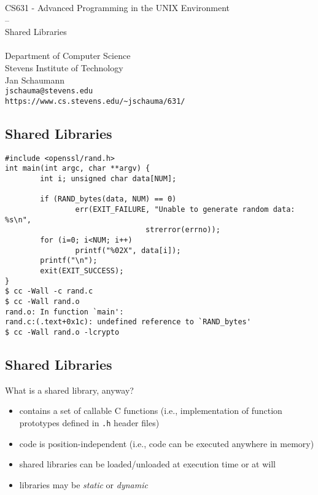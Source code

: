 \documentclass[xga]{xdvislides}
\begin{document}
\setfontphv

\lhead{\slidetitle}
\cfoot{\relax}
\rfoot{\Gray{\today}}

\newcommand{\smallish}{\fontsize{15}{20}\selectfont}

\vspace*{\fill}
\begin{center}
	\Hugesize
		CS631 - Advanced Programming in the UNIX Environment\\
		-- \\
		Shared Libraries\\
	\hspace*{5mm}\blueline\\ [1em]
	\Normalsize
		Department of Computer Science\\
		Stevens Institute of Technology\\
		Jan Schaumann\\
		\verb+jschauma@stevens.edu+\\
		\verb+https://www.cs.stevens.edu/~jschauma/631/+
\end{center}
\vspace*{\fill}

\subsection{Shared Libraries}
\begin{verbatim}
#include <openssl/rand.h>
int main(int argc, char **argv) {
        int i; unsigned char data[NUM];

        if (RAND_bytes(data, NUM) == 0)
                err(EXIT_FAILURE, "Unable to generate random data: %s\n",
                                strerror(errno));
        for (i=0; i<NUM; i++)
                printf("%02X", data[i]);
        printf("\n");
        exit(EXIT_SUCCESS);
}
$ cc -Wall -c rand.c
$ cc -Wall rand.o
rand.o: In function `main':
rand.c:(.text+0x1c): undefined reference to `RAND_bytes'
$ cc -Wall rand.o -lcrypto
\end{verbatim}

\subsection{Shared Libraries}
What is a shared library, anyway?
\begin{itemize}
	\item contains a set of callable C functions (i.e., implementation
		of function prototypes defined in {\tt .h} header files)
	\item code is position-independent (i.e., code can be executed anywhere
		in memory)
	\item shared libraries can be loaded/unloaded at execution time or at will
	\item libraries may be {\em static} or {\em dynamic}
\end{itemize}
\end{document}
